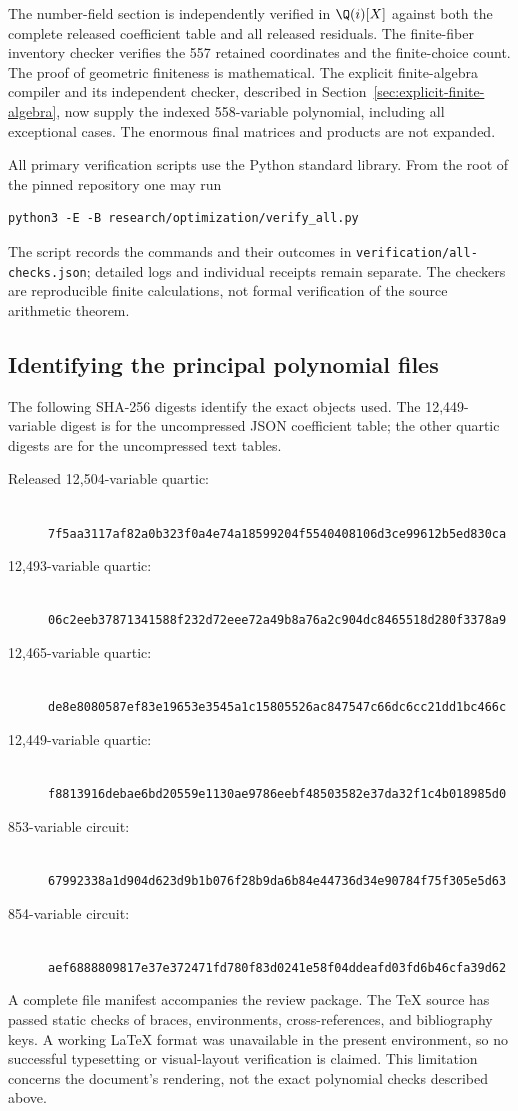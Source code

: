 The number-field section is independently verified in $\Q(i)[X]$
against both the complete released coefficient table and all released
residuals. The finite-fiber inventory checker verifies the 557 retained
coordinates and the finite-choice count. The proof of geometric
finiteness is mathematical. The explicit finite-algebra compiler and its
independent checker, described in Section~\ref{sec:explicit-finite-algebra},
now supply the indexed 558-variable polynomial, including all exceptional
cases. The enormous final matrices and products are not expanded.

All primary verification scripts use the Python standard library. From
the root of the pinned repository one may run
\begin{verbatim}
python3 -E -B research/optimization/verify_all.py
\end{verbatim}
The script records the commands and their outcomes in
\nolinkurl{verification/all-checks.json}; detailed logs and individual
receipts remain separate. The checkers are reproducible finite
calculations, not formal verification of the source arithmetic theorem.

\subsection{Identifying the principal polynomial files}

The following SHA-256 digests identify the exact objects used. The
12,449-variable digest is for the uncompressed JSON coefficient table;
the other quartic digests are for the uncompressed text tables.
\begin{description}
\item[Released 12,504-variable quartic:]
\mbox{}\\\nolinkurl{7f5aa3117af82a0b323f0a4e74a18599204f5540408106d3ce99612b5ed830ca}
\item[12,493-variable quartic:]
\mbox{}\\\nolinkurl{06c2eeb37871341588f232d72eee72a49b8a76a2c904dc8465518d280f3378a9}
\item[12,465-variable quartic:]
\mbox{}\\\nolinkurl{de8e8080587ef83e19653e3545a1c15805526ac847547c66dc6cc21dd1bc466c}
\item[12,449-variable quartic:]
\mbox{}\\\nolinkurl{f8813916debae6bd20559e1130ae9786eebf48503582e37da32f1c4b018985d0}
\item[853-variable circuit:]
\mbox{}\\\nolinkurl{67992338a1d904d623d9b1b076f28b9da6b84e44736d34e90784f75f305e5d63}
\item[854-variable circuit:]
\mbox{}\\\nolinkurl{aef6888809817e37e372471fd780f83d0241e58f04ddeafd03fd6b46cfa39d62}
\end{description}

A complete file manifest accompanies the review package. The TeX source
has passed static checks of braces, environments, cross-references, and
bibliography keys. A working LaTeX format was unavailable in the present
environment, so no successful typesetting or visual-layout verification
is claimed. This limitation concerns the document's rendering, not the
exact polynomial checks described above.
